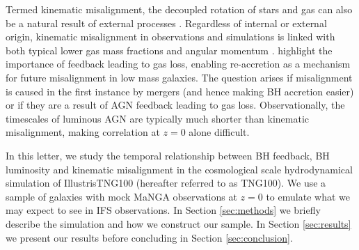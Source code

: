\documentclass[fleqn,usenatbib]{mnras}
\newcommand{\red}[1]{{\textcolor{red}{#1}}}
\begin{document}
Termed kinematic misalignment, the decoupled rotation of stars and gas can also be a natural result of external processes \cite[e.g.][]{davis2011, barrera2015, vdvoort2015, jin2016, bryant2019, duckworth2019_halo}. Regardless of internal or external origin, kinematic misalignment in observations and simulations is linked with both typical lower gas mass fractions and angular momentum \citep[][]{duckworth2019}. \citet{starkenburg+19} highlight the importance of feedback leading to gas loss, enabling re-accretion as a mechanism for future misalignment in low mass galaxies. The question arises if misalignment is caused in the first instance by mergers (and hence making BH accretion easier) or if they are a result of AGN feedback leading to gas loss. 
Observationally, the timescales of luminous AGN are typically much shorter than kinematic misalignment, making correlation at $z=0$ alone difficult. 

In this letter, we study the temporal relationship between BH feedback, BH luminosity and kinematic misalignment in the cosmological scale hydrodynamical simulation of IllustrisTNG100 (hereafter referred to as TNG100). We use a sample of galaxies with mock MaNGA \citep[Mapping Galaxies at Apache Point;][]{bundy2015, blanton2017} observations at $z=0$ to emulate what we may expect to see in IFS observations. In Section \ref{sec:methods} we briefly describe the simulation and how we construct our sample. In Section \ref{sec:results} we present our results before concluding in Section \ref{sec:conclusion}.
\end{document}
